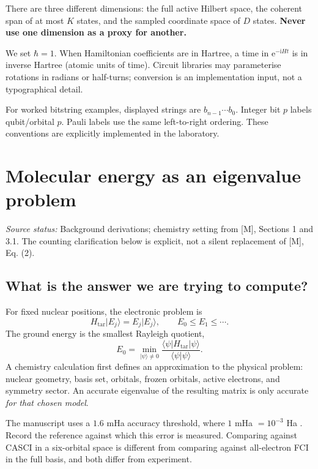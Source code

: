 \documentclass[11pt,a4paper,oneside]{report}
\newcommand{\ket}[1]{\lvert #1\rangle}
\newcommand{\bra}[1]{\langle #1\rvert}
\newcommand{\braket}[2]{\langle #1\vert #2\rangle}
\newcommand{\Ht}{H_{\mathrm{tar}}}
\newcommand{\I}{\mathrm i}
\newcommand{\e}{\mathrm e}
\newcommand{\src}[1]{\par{\small\color{grey}\textit{Source status:} #1}\par}
\begin{document}
There are three different dimensions: the full active Hilbert space, the coherent span of at most $K$ states, and the sampled coordinate space of $D$ states. \textbf{Never use one dimension as a proxy for another.}

We set $\hbar=1$. When Hamiltonian coefficients are in Hartree, a time in $\e^{-\I Ht}$ is in inverse Hartree (atomic units of time). Circuit libraries may parameterise rotations in radians or half-turns; conversion is an implementation input, not a typographical detail.

For worked bitstring examples, displayed strings are $b_{n-1}\cdots b_0$. Integer bit $p$ labels qubit/orbital $p$. Pauli labels use the same left-to-right ordering. These conventions are explicitly implemented in the laboratory.

\clearpage{}
\chapter{Molecular energy as an eigenvalue problem}\label{ch:chem}
\src{Background derivations; chemistry setting from [M], Sections 1 and 3.1. The counting clarification below is explicit, not a silent replacement of [M], Eq. (2).}

\section{What is the answer we are trying to compute?}
For fixed nuclear positions, the electronic problem is
\begin{equation}
\Ht\ket{E_j}=E_j\ket{E_j},\qquad E_0\le E_1\le\cdots.
\end{equation}
The ground energy is the smallest Rayleigh quotient,
\begin{equation}\label{eq:rayleigh}
E_0=\min_{\ket\psi\ne0}\frac{\bra\psi\Ht\ket\psi}{\braket\psi\psi}.
\end{equation}
A chemistry calculation first defines an approximation to the physical problem: nuclear geometry, basis set, orbitals, frozen orbitals, active electrons, and symmetry sector. An accurate eigenvalue of the resulting matrix is only accurate \emph{for that chosen model}.

The manuscript uses a $1.6$ mHa accuracy threshold, where $1$ mHa $=10^{-3}$ Ha \cite{kumar}. Record the reference against which this error is measured. Comparing against CASCI in a six-orbital space is different from comparing against all-electron FCI in the full basis, and both differ from experiment.
\end{document}
